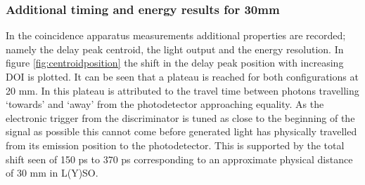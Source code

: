 \subsubsection{Additional timing and energy results for 30mm}
In the coincidence apparatus measurements additional properties are recorded; namely the delay peak centroid, the light output and the energy resolution. In figure \ref{fig:centroidposition} the shift in the delay peak position with increasing DOI is plotted. It can be seen that a plateau is reached for both configurations at 20 mm. In \cite{Moses_Derenzo_1999} this plateau is attributed to the travel time between photons travelling `towards' and `away' from the photodetector approaching equality. As the electronic trigger from the discriminator is tuned as close to the beginning of the signal as possible this cannot come before generated light has physically travelled from its emission position to the photodetector. This is supported by the total shift seen of 150 ps to 370 ps corresponding to an approximate physical distance of 30 mm in L(Y)SO.
